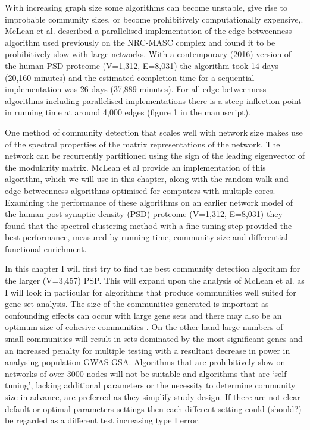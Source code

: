  With increasing graph size some algorithms can become unstable, give rise to improbable community sizes, or become prohibitively computationally expensive\cite{pocklington2006proteomes},\cite{mclean2016improved}. 
McLean et al.\cite{mclean2016improved} described a parallelised implementation of the edge betweenness algorithm used previously on the NRC-MASC complex\cite{pocklington2006organization} and found it to be prohibitively slow with large networks. With a contemporary (2016) version of the human PSD proteome (V=1,312, E=8,031) the algorithm took 14 days (20,160 minutes) and the estimated completion time for a sequential implementation was 26 days (37,889 minutes). For all edge betweenness algorithms including parallelised implementations there is a steep inflection point in running time at around 4,000 edges (figure 1 in the manuscript\cite{mclean2016improved}).

One method of community detection that scales well with network size makes use of the spectral properties of the matrix representations of the network\cite{newman2013spectral}.  The network can be recurrently partitioned using the sign of the leading eigenvector of the modularity matrix\cite{newman2013spectral}.  McLean et al \cite{mclean2016improved} provide an implementation of this algorithm, which we will use in this chapter, along with the random walk and edge betweenness algorithms optimised for computers with multiple cores. Examining the performance of these algorithms on an earlier network model of the human post synaptic density (PSD) proteome (V=1,312, E=8,031) they found that the spectral clustering method with a fine-tuning step provided the best performance, measured by running time, community size and differential functional enrichment. 

In this chapter I will first try to find the best community detection algorithm for the larger (V=3,457) PSP. This will expand upon the analysis of McLean\cite{mclean2016improved} et al. as I will look in particular for algorithms that produce communities well suited for gene set analysis. The size of the communities generated is important as confounding effects can occur with large gene sets\cite{de2016statistical} and there may also be an optimum size of cohesive communities \cite{leskovec2009community}. On the other hand large numbers of small communities will result in sets dominated by the most significant genes and an increased penalty for multiple testing with a resultant decrease in power in analysing population GWAS-GSA. Algorithms that are prohibitively slow on networks of over 3000 nodes will not be suitable and algorithms that are `self-tuning', lacking additional parameters or the necessity to determine community size in advance, are preferred as they simplify study design. If there are not clear default or optimal parameters settings then each different setting could (should?) be regarded as a different test increasing type I error. 


